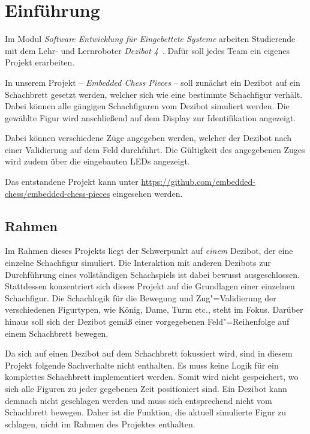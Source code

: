 
\section{Einführung}

Im Modul \emph{Software Entwicklung für Eingebettete Systeme} arbeiten Studierende mit dem Lehr- und Lernroboter \emph{Dezibot 4}~\cite{dezibotteamDezibotDezibot2025}. Dafür soll jedes Team ein eigenes Projekt erarbeiten.

In unserem Projekt -- \emph{Embedded Chess Pieces} -- soll zunächst ein Dezibot auf ein Schachbrett gesetzt werden, welcher sich wie eine bestimmte Schachfigur verhält. Dabei können alle gängigen Schachfiguren vom Dezibot simuliert werden. Die gewählte Figur wird anschließend auf dem Display zur Identifikation angezeigt.

Dabei können verschiedene Züge angegeben werden, welcher der Dezibot nach einer Validierung auf dem Feld durchführt. Die Gültigkeit des angegebenen Zuges wird zudem über die eingebauten LEDs angezeigt.

Das entstandene Projekt kann unter \url{https://github.com/embedded-chess/embedded-chess-pieces} eingesehen werden.


\subsection{Rahmen}

Im Rahmen dieses Projekts liegt der Schwerpunkt auf \emph{einem} Dezibot, der eine einzelne Schachfigur simuliert. Die Interaktion mit anderen Dezibots zur Durchführung eines vollständigen Schachspiels ist dabei bewusst ausgeschlossen. Stattdessen konzentriert sich dieses Projekt auf die Grundlagen einer einzelnen Schachfigur. Die Schachlogik für die Bewegung und Zug"=Validierung der verschiedenen Figurtypen, wie König, Dame, Turm etc., steht im Fokus. Darüber hinaus soll sich der Dezibot gemäß einer vorgegebenen Feld"=Reihenfolge auf einem Schachbrett bewegen.


Da sich auf einen Dezibot auf dem Schachbrett fokussiert wird, sind in diesem Projekt folgende Sachverhalte nicht enthalten. Es muss keine Logik für ein komplettes Schachbrett implementiert werden. Somit wird nicht gespeichert, wo sich alle Figuren zu jeder gegebenen Zeit positioniert sind. Ein Dezibot kann demnach nicht geschlagen werden und muss sich entsprechend nicht vom Schachbrett bewegen. Daher ist die Funktion, die aktuell simulierte Figur zu schlagen, nicht im Rahmen des Projektes enthalten.

